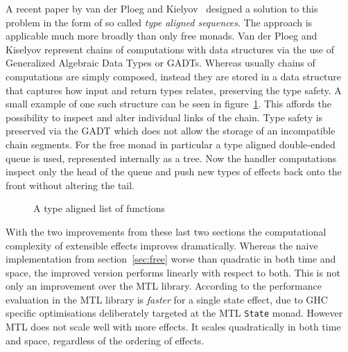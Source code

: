 A recent paper by van der Ploeg and Kielyov~\cite{ftc-queue} designed a solution
to this problem in the form of so called \emph{type aligned sequences}. The
approach is applicable much more broadly than only free monads. Van der Ploeg
and Kiselyov represent chains of computations with data structures via the use
of Generalized Algebraic Data Types or GADTs. Whereas usually chains of
computations are simply composed, instead they are stored in a data structure
that captures how input and return types relates, preserving the type safety. A
small example of one such structure can be seen in
figure~\ref{fig:type-aligned-list}. This affords the possibility to inspect and
alter individual links of the chain. Type safety is preserved via the GADT which
does not allow the storage of an incompatible chain segments. For the free monad
in particular a type aligned double-ended queue is used, represented internally
as a tree. Now the handler computations inspect only the head of the queue and
push new types of effects back onto the front without altering the tail.

\begin{figure}
  
  \caption{A type aligned list of functions}
  \label{fig:type-aligned-list}
\end{figure}

With the two improvements from these last two sections the computational
complexity of extensible effects improves dramatically. Whereas the naive
implementation from section~\ref{sec:free} worse than quadratic in both time and
space, the improved version performs linearly with respect to both. This is not
only an improvement over the MTL library. According to the performance
evaluation in \cite{freer} the MTL library is \emph{faster} for a single state
effect, due to GHC specific optimisations deliberately targeted at the MTL
\texttt{State} monad. However MTL does not scale well with more effects. It
scales quadratically in both time and space, regardless of the ordering of
effects.
